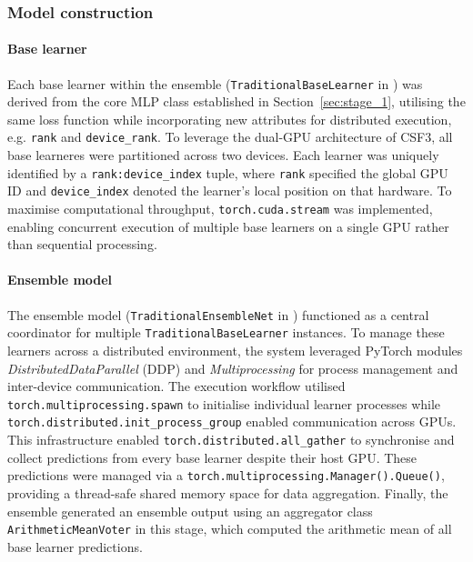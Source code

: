 \documentclass{article}
\begin{document}
\subsubsection{Model construction}
\paragraph{Base learner}
Each base learner within the ensemble (\texttt{TraditionalBaseLearner} in ) was derived from the core MLP class established in Section~\ref{sec:stage_1}, utilising the same loss function while incorporating new attributes for distributed execution, e.g. \texttt{rank} and \texttt{device\_rank}. To leverage the dual-GPU architecture of CSF3, all base learneres were partitioned across two devices. Each learner was uniquely identified by a \texttt{rank:device\_index} tuple, where \texttt{rank} specified the global GPU ID and \texttt{device\_index} denoted the learner's local position on that hardware. To maximise computational throughput, \texttt{torch.cuda.stream} was implemented, enabling concurrent execution of multiple base learners on a single GPU rather than sequential processing. 

\paragraph{Ensemble model}
The ensemble model (\texttt{TraditionalEnsembleNet} in ) functioned as a central coordinator for multiple \texttt{TraditionalBaseLearner} instances. To manage these learners across a distributed environment, the system leveraged PyTorch modules \textit{DistributedDataParallel} (DDP) and \textit{Multiprocessing} for process management and inter-device communication. 
The execution workflow utilised \texttt{torch.multiprocessing.spawn} to initialise individual learner processes while 
\\
\texttt{torch.distributed.init\_process\_group} enabled communication across GPUs. This infrastructure enabled \texttt{torch.distributed.all\_gather} to synchronise and collect predictions from every base learner despite their host GPU. These predictions were managed via a \texttt{torch.multiprocessing.Manager().Queue()}, providing a thread-safe shared memory space for data aggregation. 
Finally, the ensemble generated an ensemble output using an aggregator class \texttt{ArithmeticMeanVoter} in this stage, which computed the arithmetic mean of all base learner predictions. 
\end{document}
